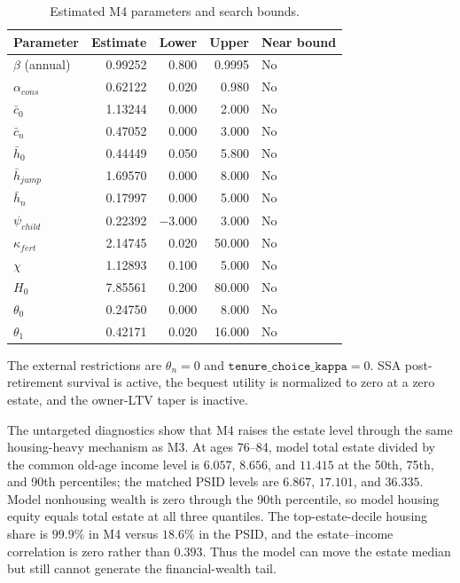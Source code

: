 \documentclass[10pt]{article}
\begin{document}
\begin{table}[!htb]
\centering
\caption{Estimated M4 parameters and search bounds.}\label{tab:m4parameters}
\begin{tabular}{lrrrl}
\toprule
Parameter & Estimate & Lower & Upper & Near bound \\
\midrule
$\beta$ (annual) & 0.99252 & 0.800 & 0.9995 & No \\
$\alpha_{cons}$ & 0.62122 & 0.020 & 0.980 & No \\
$\bar c_0$ & 1.13244 & 0.000 & 2.000 & No \\
$\bar c_n$ & 0.47052 & 0.000 & 3.000 & No \\
$\bar h_0$ & 0.44449 & 0.050 & 5.800 & No \\
$\bar h_{jump}$ & 1.69570 & 0.000 & 8.000 & No \\
$\bar h_n$ & 0.17997 & 0.000 & 5.000 & No \\
$\psi_{child}$ & 0.22392 & $-3.000$ & 3.000 & No \\
$\kappa_{fert}$ & 2.14745 & 0.020 & 50.000 & No \\
$\chi$ & 1.12893 & 0.100 & 5.000 & No \\
$H_0$ & 7.85561 & 0.200 & 80.000 & No \\
$\theta_0$ & 0.24750 & 0.000 & 8.000 & No \\
$\theta_1$ & 0.42171 & 0.020 & 16.000 & No \\
\bottomrule
\end{tabular}
\end{table}

The external restrictions are $\theta_n=0$ and
$\texttt{tenure\_choice\_kappa}=0$. SSA post-retirement survival is active,
the bequest utility is normalized to zero at a zero estate, and the owner-LTV
taper is inactive.

The untargeted diagnostics show that M4 raises the estate level through the
same housing-heavy mechanism as M3. At ages 76--84, model total estate divided
by the common old-age income level is $6.057$, $8.656$, and $11.415$ at the
50th, 75th, and 90th percentiles; the matched PSID levels are $6.867$,
$17.101$, and $36.335$. Model nonhousing wealth is zero through the 90th
percentile, so model housing equity equals total estate at all three
quantiles. The top-estate-decile housing share is $99.9\%$ in M4 versus
$18.6\%$ in the PSID, and the estate--income correlation is zero rather than
$0.393$. Thus the model can move the estate median but still cannot generate
the financial-wealth tail.
\end{document}
